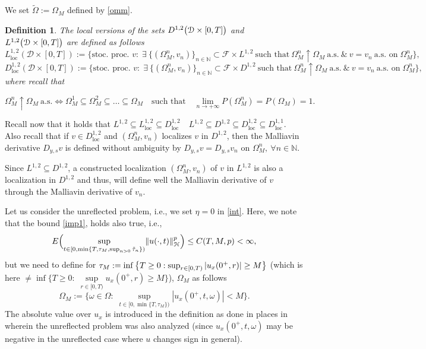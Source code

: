 \documentclass[reqno]{amsart}
\numberwithin{equation}{section}
\newtheorem{definition}[theorem]{Definition}
\newcommand{\mN}{\mathbb{N}}
\newcommand{\Om}{\Omega}
\newcommand{\cd}{\mathcal{D}}
\begin{document}
We set $\tilde{\Omega}:=\Omega_M$ defined by \eqref{omm}.
\begin{definition}
The local versions of the sets $D^{1,2}\bigl{(}\cd\times[0,T]\bigr{)}$ and $L^{1,2}\bigl{(}\cd\times[0,T]\bigr{)}$ are defined as follows
$$L^{1,2}_{\text{loc}}(\cd\times[0,T]):=\{ \mbox{stoc. proc. } v:\; \exists\ \{(\Om_M^n,v_n)\}_{n\in\mN}\subset\mathcal{F}\times L^{1,2}
\ \text{such that}\ \Om_M^{n}\uparrow \Om_M\ \text{a.s.}\ \&\ v=v_{n}\ \mbox{a.s.\ on}\; \Om_M^n\},$$
$$D^{1,2}_{\text{loc}}(\cd\times[0,T]):=\{ \mbox{stoc. proc. } v:\; \exists\ \{(\Om_M^n,v_n)\}_{n\in\mN}\subset\mathcal{F}
\times D^{1,2}\ \text{such that}\ \Om_M^n\uparrow \Om_M\ \text{a.s.}\ \&\ v=v_n\ \mbox{a.s.\ on}\;
 \Om_M^n\},$$
where recall that

$$\Om_M^n\uparrow \Om_M\ \text{a.s.}\iff\Om_M^{1}\subseteq\Om_M^2\subseteq\dots\subseteq\Om_M
\quad \text{such that}\quad
\lim_{n\rightarrow+\infty} P(\Om_M^n) = P(\Om_M) = 1.$$
\end{definition}

\vspace{0.5cm}

Recall now that it holds that $L^{1,2}\subseteq
L^{1,2}_{\text{loc}}\subseteq D^{1,2}_{\text{loc}}$\ \ $L^{1,2}\subseteq D^{1,2}\subseteq
D^{1,2}_{\text{loc}}\subseteq D^{1,1}_{\text{loc}}$. Also recall
that if $v\in D^{1,2}_{\text{loc}}$ and $(\Om_M^n,v_n)$
localizes $v$ in $D^{1,2}$, then the Malliavin derivative $D_{y,s}v$
is defined without ambiguity by $D_{y,s}v=D_{y,s}v_n$ on $\Om_M^n,\ \forall n\in\mN$.

Since $L^{1,2}\subseteq D^{1,2}$, a constructed localization $(\Om_M^{n},v_{n})$ of $v$ in $L^{1,2}$ is also a localization in $D^{1,2}$ and thus, will define well the Malliavin derivative of $v$ through the Malliavin derivative of $v_n$.

\vspace{0.5cm}

Let us consider the unreflected problem, i.e., we set $\eta=0$ in
\eqref{int}. Here, we note that the bound
\eqref{imp1}, holds
also true, i.e.,
\begin{equation*}%
E\Big{(}\displaystyle{\sup_{t\in[0,\min\{T,\tau_M,\sup_{n>0}\tilde{\tau}_n\})}}\|u(\cdot,t)\|_{\mathcal{H}}^p\Big{)}\leq
C(T,M,p)<\infty,
\end{equation*}
but we need to define for $\tau_M:=\inf\big{\{}T\geq
0: \sup_{r\in[0,T)}|u_x(0^+,r)|\geq M\big{\}}$
(which is here $\neq\inf\{T\geq
0:\;{\sup\limits_{r\in[0,T)}} u_x(0^+,r)\geq M\}$),
$\Omega_M$ as follows
\begin{equation}\label{ommnew}
\Omega_M:=\Big\{\omega\in\Omega:\;\displaystyle{\sup_{t\in[0,\min\{T,\tau_M\})}}
|u_x(0^+,t,\omega)|< M\Big\}.
\end{equation}
The absolute value over $u_x$ is introduced in the definition as done in places in \cite{AFK2} wherein the unreflected problem was also analyzed (since $u_x(0^+,t,\omega)$ may be negative in the unreflected case where $u$ changes sign in general).
\end{document}
